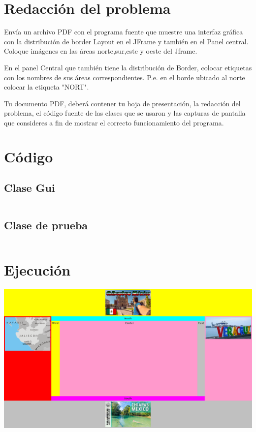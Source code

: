 \documentclass[12pt]{article}
\begin{document}
\pagestyle{empty}

\section*{ Redacción del problema }

Envía un archivo PDF con el programa fuente que muestre una interfaz
gráfica con la distribución de border Layout en el JFrame y también en
el Panel central.  Coloque imágenes en las áreas norte,sur,este y
oeste del Jframe.

En el panel Central que también tiene la distribución de Border,
colocar etiquetas con los nombres de sus áreas
correspondientes. P.e. en el borde ubicado al norte colocar la
etiqueta "NORT".

Tu documento PDF, deberá contener tu hoja de presentación, la
redacción del problema, el código fuente de las clases que se usaron y
las capturas de pantalla que consideres a fin de mostrar el correcto
funcionamiento del programa.
\section*{ Código }

\subsection*{ Clase Gui }
\inputminted{Java}{./Gui.java}

\subsection*{ Clase de prueba }
\inputminted{Java}{./PruebaGui.java}

\section*{ Ejecución }
\includegraphics[width=\textwidth]{Corrida.png}
\end{document}
